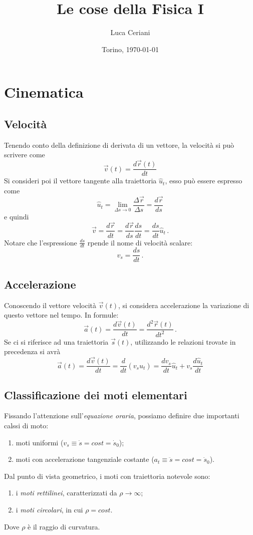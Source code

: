 \documentclass{article}
\title{\vspace*{\fill}\Huge{Le cose della Fisica I}} %
\author{Luca Ceriani\bigskip}
\date{Torino, \today\vspace*{\fill}}
\begin{document}
\maketitle
\thispagestyle{empty}
\newpage
\section{Cinematica}

\subsection{Velocità}
Tenendo conto della definizione di derivata di un vettore, la velocità si può scrivere come
\[\vec{v}(t)=\frac{d\vec{r}(t)}{dt}\]
Si consideri poi il vettore tangente alla traiettoria $\hat{u}_t$, esso può essere espresso come
\[\hat{u}_t=\lim_{\Delta s\rightarrow 0}\dfrac{\Delta\vec{r}}{\Delta s}
= \frac{d\vec{r}}{ds}\]
e quindi
\[\vec{v}=\frac{d\vec{r}}{dt}=\frac{d\vec{r}}{ds}\frac{ds}{dt}=\frac{ds}{dt}\hat{u}_t\,.\]
Notare che l'espressione $\frac{ds}{dt}$ rpende il nome di velocità scalare:
\[v_s=\frac{ds}{dt}\,.\]

\subsection{Accelerazione}
Conoscendo il vettore velocità $\vec{v}(t)$, si considera accelerazione la variazione di questo vettore nel tempo. In formule:
\[\vec{a}(t)=\frac{d\vec{v}(t)}{dt}=\frac{d^2 \vec{r}(t)}{dt^2}\,.\]
Se ci si riferisce ad una traiettoria $\vec{s}(t)$, utilizzando le relazioni trovate in precedenza si avrà
\[\vec{a}(t)=\frac{d\vec{v}(t)}{dt}=\frac{d}{dt}(v_s \hat{u}_t)=\frac{dv_s}{dt}\hat{u}_t+v_s\frac{d\hat{u}_t}{dt}\]

\subsection{Classificazione dei moti elementari}
Fissando l'attenzione sull'\textit{equazione oraria}, possiamo definire due importanti calssi di moto:
\begin{enumerate}
\item moti uniformi ($v_s\equiv \dot{s} = cost = \dot{s}_0$);
\item{moti con accelerazione tangenziale costante ($a_t\equiv \ddot{s} = cost = \ddot{s}_0$).}
\end{enumerate}
Dal punto di vista geometrico, i moti con traiettoria notevole sono:
\begin{enumerate}
\item i \emph{moti rettilinei}, caratterizzati da $\rho \rightarrow \infty$;
\item i \emph{moti circolari}, in cui $\rho = cost$.
\end{enumerate}
Dove $\rho$ è il raggio di curvatura.
\end{document}
